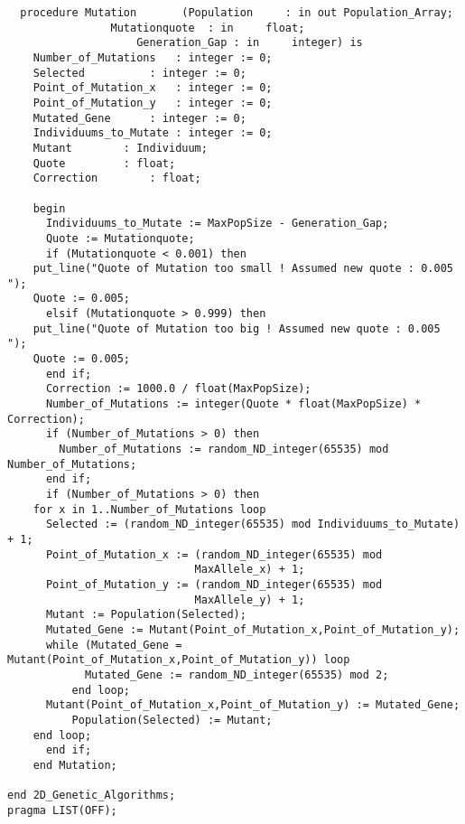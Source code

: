 \begin{verbatim}
  procedure Mutation       (Population     : in out Population_Array;
			    Mutationquote  : in     float;
		            Generation_Gap : in     integer) is
    Number_of_Mutations   : integer := 0;
    Selected		  : integer := 0;
    Point_of_Mutation_x   : integer := 0;
    Point_of_Mutation_y   : integer := 0;
    Mutated_Gene	  : integer := 0;
    Individuums_to_Mutate : integer := 0;
    Mutant		  : Individuum;
    Quote		  : float;
    Correction		  : float;

    begin
      Individuums_to_Mutate := MaxPopSize - Generation_Gap;
      Quote := Mutationquote;
      if (Mutationquote < 0.001) then
	put_line("Quote of Mutation too small ! Assumed new quote : 0.005 ");
	Quote := 0.005;
      elsif (Mutationquote > 0.999) then
	put_line("Quote of Mutation too big ! Assumed new quote : 0.005 ");
	Quote := 0.005;
      end if;
      Correction := 1000.0 / float(MaxPopSize);
      Number_of_Mutations := integer(Quote * float(MaxPopSize) * Correction);
      if (Number_of_Mutations > 0) then
        Number_of_Mutations := random_ND_integer(65535) mod Number_of_Mutations;
      end if;
      if (Number_of_Mutations > 0) then
	for x in 1..Number_of_Mutations loop
	  Selected := (random_ND_integer(65535) mod Individuums_to_Mutate) + 1;
	  Point_of_Mutation_x := (random_ND_integer(65535) mod
	                         MaxAllele_x) + 1;
	  Point_of_Mutation_y := (random_ND_integer(65535) mod
	                         MaxAllele_y) + 1;
	  Mutant := Population(Selected);
	  Mutated_Gene := Mutant(Point_of_Mutation_x,Point_of_Mutation_y);
	  while (Mutated_Gene = Mutant(Point_of_Mutation_x,Point_of_Mutation_y)) loop
            Mutated_Gene := random_ND_integer(65535) mod 2; 
          end loop;
	  Mutant(Point_of_Mutation_x,Point_of_Mutation_y) := Mutated_Gene;
          Population(Selected) := Mutant;
	end loop;
      end if;
    end Mutation;

end 2D_Genetic_Algorithms;
pragma LIST(OFF);
\end{verbatim}
